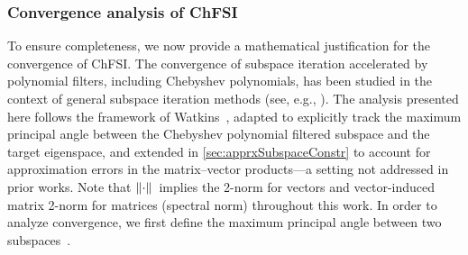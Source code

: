 \documentclass[preprint,3p,number,sort&compress]{elsarticle}
\newtheorem{definition}[theorem]{Definition}
\newcommand{\bX}{\textbf{X}}
\newcommand{\bY}{\textbf{Y}}
\newcommand{\cblue }{\color{black}}
\newcommand{\cn}{\color{black}}
\DeclarePairedDelimiter\norm{\lVert}{\rVert\,}%
\begin{document}
\subsubsection{Convergence analysis of ChFSI}
To ensure completeness, we now provide a mathematical justification for the convergence of ChFSI. {\cblue The convergence of subspace iteration accelerated by polynomial filters, including Chebyshev polynomials, has been studied in the context of general subspace iteration methods (see, e.g., \cite{watkinsMatrixEigenvalueProblem2007,saadNumericalMethodsLarge2011}). The analysis presented here follows the framework of Watkins~\cite{watkinsMatrixEigenvalueProblem2007}, adapted to explicitly track the maximum principal angle between the Chebyshev polynomial filtered subspace and the target eigenspace, and extended in \cref{sec:apprxSubspaceConstr} to account for approximation errors in the matrix--vector products---a setting not addressed in prior works.\cn} Note that $\norm{\cdot}$ implies the 2-norm for vectors and vector-induced matrix 2-norm for matrices (spectral norm) throughout this work. In order to analyze convergence, we first define the maximum principal angle between two subspaces~\cite{chenSpectralMethodsData2021,zhuAnglesSubspacesTheir2013,watkinsMatrixEigenvalueProblem2007}.
\end{document}
